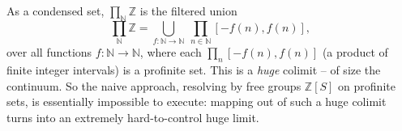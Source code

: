 \begin{remark}
\label{rmk:4:huge-colimit}
As a condensed set, $\prod_{\mathbb{N}}\mathbb{Z}$ is the filtered union
\begin{equation*}
\prod_{\mathbb{N}}\mathbb{Z}=\bigcup_{f\colon\mathbb{N}\to\mathbb{N}}\
\prod_{n\in\mathbb{N}}[-f(n),f(n)],
\end{equation*}
over all functions $f\colon\mathbb{N}\to\mathbb{N}$, where each
$\prod_{n}[-f(n),f(n)]$ (a product of finite integer intervals) is a profinite
set. This is a \emph{huge} colimit -- of size the continuum. So the naive
approach, resolving by free groups $\mathbb{Z}[S]$ on profinite sets, is
essentially impossible to execute: mapping out of such a huge colimit turns into
an extremely hard-to-control huge limit.
\end{remark}

